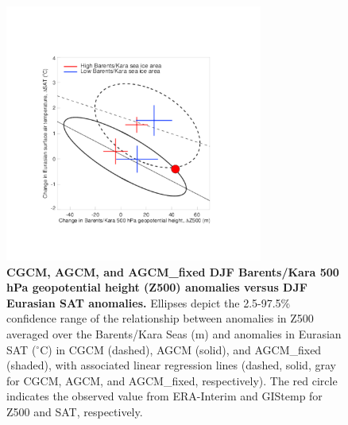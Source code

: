 \documentclass{nature}
\begin{document}
\begin{figure}%
\centering
\noindent\includegraphics[width=20pc]{Word/Figure_4.pdf}
\caption{\textbf{CGCM, AGCM, and AGCM\_fixed DJF Barents/Kara 500 hPa geopotential height (Z500) anomalies versus DJF Eurasian SAT anomalies.} Ellipses depict the 2.5-97.5\% confidence range of the relationship between anomalies in Z500 averaged over the Barents/Kara Seas (m) and anomalies in Eurasian SAT ($^\circ$C) in CGCM (dashed), AGCM (solid), and AGCM\_fixed (shaded), with associated linear regression lines (dashed, solid, gray for CGCM, AGCM, and AGCM\_fixed, respectively). The red circle indicates the observed value from ERA-Interim and GIStemp for Z500 and SAT, respectively. 
} %
\label{fig:fig4} 
\end{figure}
\end{document}
